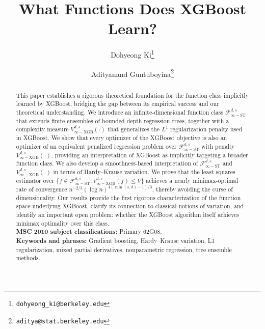 \documentclass[10pt]{article}
\begin{document}
\title{What Functions Does XGBoost Learn?}
\author{Dohyeong Ki\thanks{\texttt{dohyeong\_ki@berkeley.edu}} }
\author{Adityanand Guntuboyina\thanks{\texttt{aditya@stat.berkeley.edu}}}
\date{} %

\maketitle
\vspace{-1.5em}

\begin{abstract}

This paper establishes a rigorous theoretical foundation for the
function class implicitly learned by XGBoost, bridging the gap 
between its empirical success and our theoretical understanding. 
We introduce an infinite-dimensional function class 
$\mathcal{F}^{d, s}_{\infty-\text{ST}}$ that extends finite ensembles 
of bounded-depth regression trees, together with a complexity measure 
$V^{d, s}_{\infty-\text{XGB}}(\cdot)$ that generalizes the $L^1$ 
regularization penalty used in XGBoost. We show that every optimizer 
of the XGBoost objective is also an optimizer of an equivalent 
penalized regression problem over $\mathcal{F}^{d, s}_{\infty-\text{ST}}$ 
with penalty $V^{d, s}_{\infty-\text{XGB}}(\cdot)$, providing an 
interpretation of XGBoost as implicitly targeting a broader function 
class. We also develop a smoothness-based interpretation of 
$\mathcal{F}^{d, s}_{\infty-\text{ST}}$ and 
$V^{d, s}_{\infty-\text{XGB}}(\cdot)$ in terms of 
Hardy--Krause variation. We prove that the least squares estimator over 
$\{f \in \mathcal{F}^{d, s}_{\infty-\text{ST}}: 
V^{d, s}_{\infty-\text{XGB}}(f) \le V\}$ achieves a nearly 
minimax-optimal rate of convergence 
$n^{-2/3} (\log n)^{4(\min(s, d) - 1)/3}$, thereby avoiding the 
curse of dimensionality. Our results provide the first rigorous 
characterization of the function space underlying XGBoost, clarify 
its connection to classical notions of variation, and identify an 
important open problem: whether the XGBoost algorithm itself 
achieves minimax optimality over this class.   
\vspace{0.5em} \\
\noindent\textbf{MSC 2010 subject classifications:} Primary 62G08. \\
\noindent\textbf{Keywords and phrases:} Gradient boosting, 
Hardy–Krause variation, L1 regularization, mixed partial derivatives,
nonparametric regression, tree ensemble methods. 
\end{abstract}
\end{document}
